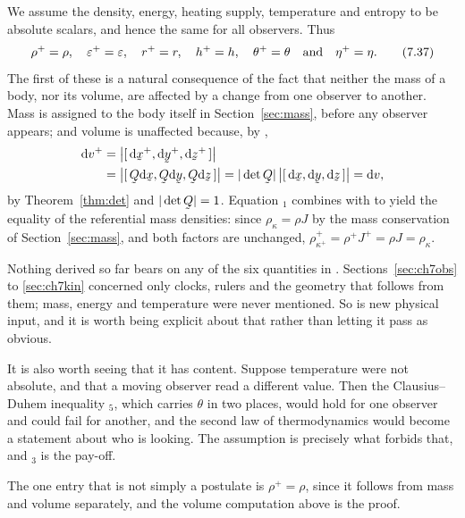 We assume the density, energy, heating supply, temperature and entropy to
be absolute scalars, and hence the same for all observers. Thus
\begin{equation}
   \rho^{+}=\rho,\quad \varepsilon^{+}=\varepsilon,\quad r^{+}=r,\quad
   h^{+}=h,\quad \theta^{+}=\theta
   \quad\text{and}\quad \eta^{+}=\eta .
   \tag{7.37}\label{eq:7.37}
\end{equation}
The first of these is a natural consequence of the fact that neither the
mass of a body, nor its volume, are affected by a change from one
observer to another. Mass is assigned to the body itself in
Section~\ref{sec:mass}, before any observer appears; and volume is
unaffected because, by ,
\[
\begin{aligned}
   \dl v^{+}&=\big|\tbox{\dl\bx^{+}}{\dl\by^{+}}{\dl\bz^{+}}\big|
   \\
   &=\big|\tbox{\bQ\dl\bx}{\bQ\dl\by}{\bQ\dl\bz}\big|
   =|\det\bQ|\,\big|\tbox{\dl\bx}{\dl\by}{\dl\bz}\big|=\dl v ,
\end{aligned}
\]
by Theorem~\ref{thm:det} and $|\det\bQ|=1$. Equation $_{1}$
combines with  to yield the equality of the referential mass
densities: since $\rho_{\kappa}=\rho J$ by the mass conservation of
Section~\ref{sec:mass}, and both factors are unchanged,
$\rho^{+}_{\kappa^{+}}=\rho^{+}J^{+}=\rho J=\rho_{\kappa}$.

\begin{remark}\label{rem:ch7absolute}
Nothing derived so far bears on any of the six quantities in .
Sections~\ref{sec:ch7obs} to \ref{sec:ch7kin} concerned only clocks,
rulers and the geometry that follows from them; mass, energy and
temperature were never mentioned. So  is new physical input,
and it is worth being explicit about that rather than letting it pass as
obvious.

It is also worth seeing that it has content. Suppose temperature were not
absolute, and that a moving observer read a different value. Then the
Clausius--Duhem inequality $_{5}$, which carries $\theta$ in
two places, would hold for one observer and could fail for another, and
the second law of thermodynamics would become a statement about who is
looking. The assumption  is precisely what forbids that, and
$_{3}$ is the pay-off.

The one entry that is not simply a postulate is $\rho^{+}=\rho$, since it
follows from mass and volume separately, and the volume computation above
is the proof.
\end{remark}

